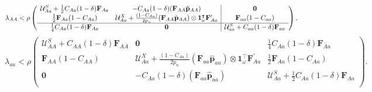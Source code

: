 \documentclass[11pt]{article}
\def\mbf#1{\mathbf{#1}}
\def\mcal#1{\mathcal{#1}}
\begin{document}
\begin{equation} \label{eq:coexist_AA}
	\lambda_{AA} < 
		\rho \left(\begin{array}{cc|c}
				\mcal{U}^S_{Aa} + \frac{1}{2} C_{Aa} (1 - \delta) \mbf{F}_{Aa} & -C_{Aa}(1 - \delta) (\mbf{F}_{AA} \hat{\mbf{p}}_{AA}) & \mbf{0} \\
				\frac{1}{2} \mbf{F}_{Aa} (1 - C_{Aa}) & \mcal{U}^X_{Aa} + \frac{(1 - C_{Aa})}{2 p_n} (\mbf{F}_{AA} \hat{\mbf{p}}_{AA}) \otimes \mbf{1}^{\intercal}_{\omega} \mbf{F}^{\prime}_{Aa} & \mbf{F}_{aa} (1 - C_{aa}) \\ \hline
				\frac{1}{4} C_{Aa} (1 - \delta) \mbf{F}_{Aa} & \mbf{0} & \mcal{U}^S_{aa} + C_{aa} (1 - \delta) \mbf{F}_{aa} \\ 
			\end{array} \right), \\ 
\end{equation} 
\begin{equation} \label{eq:coexist_aa}
	\lambda_{aa} < 
		\rho \left(\begin{array}{c|cc}
				\mcal{U}^S_{AA} + C_{AA} (1 - \delta) \mbf{F}_{AA} & \mbf{0} & \frac{1}{4} C_{Aa} (1 - \delta) \mbf{F}_{Aa}\\ \hline
				\mbf{F}_{AA} (1 - C_{AA}) & \mcal{U}^X_{Aa} + \frac{(1 - C_{Aa})}{2 p_n} (\mbf{F}_{aa} \hat{\mbf{p}}_{aa}) \otimes \mbf{1}^{\intercal}_{\omega} \mbf{F}^{\prime}_{Aa} & \frac{1}{2} \mbf{F}_{Aa} (1 - C_{Aa}) \\ 
				\mbf{0} & -C_{Aa}(1 - \delta) (\mbf{F}_{aa} \hat{\mbf{p}}_{aa}) & \mcal{U}^S_{Aa} + \frac{1}{2} C_{Aa} (1 - \delta) \mbf{F}_{Aa} \\
			\end{array} \right). 
\end{equation}
\end{document}
